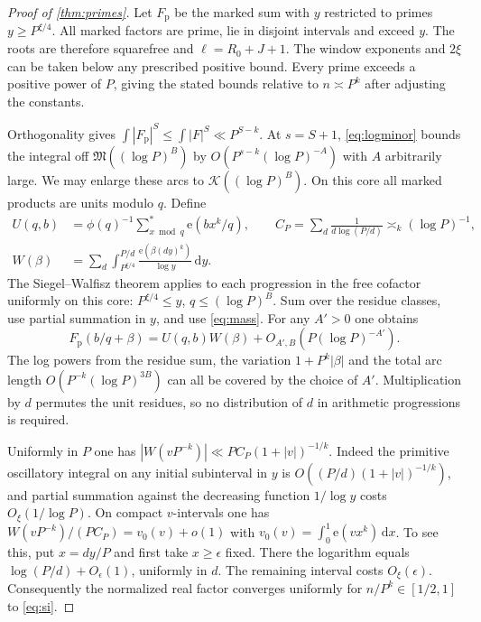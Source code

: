\documentclass[11pt,letterpaper]{article}
\theoremstyle{definition}
\newcommand{\M}{\mathfrak M}
\newcommand{\e}{\mathrm e}
\newcommand{\dd}{\,\mathrm d}
\begin{document}
\begin{proof}[Proof of \cref{thm:primes}]
Let $F_{\mathrm p}$ be the marked sum with $y$ restricted to primes
$y\ge P^{\xi/4}$. All marked factors are prime, lie in disjoint
intervals and exceed $y$. The roots are therefore squarefree and
$\ell=R_0+J+1$. The window exponents and $2\xi$ can be taken below
any prescribed positive bound. Every prime exceeds a positive power
of $P$, giving the stated bounds relative to $n\asymp P^k$ after
adjusting the constants.

Orthogonality gives $\int|F_{\mathrm p}|^S\le\int|F|^S
\ll P^{S-k}$. At $s=S+1$, \eqref{eq:logminor} bounds the integral
off $\M((\log P)^B)$ by $O(P^{s-k}(\log P)^{-A})$ with $A$ arbitrarily
large. We may enlarge these arcs to $\mathcal K((\log P)^B)$.
On this core all marked products are units modulo $q$. Define
\begin{align*}
 U(q,b)&=\phi(q)^{-1}\!\!\sum_{x\bmod q}^{\!*}\e(bx^k/q), \qquad C_P=\sum_d\frac1{d\log(P/d)}\asymp_k(\log P)^{-1},\\
 W(\beta)&=\sum_d\int_{P^{\xi/4}}^{P/d}
       \frac{\e(\beta(dy)^k)}{\log y}\dd y.
\end{align*}
The Siegel--Walfisz theorem \cite[Corollary 11.19]{MV} applies to
each progression in the free cofactor uniformly on this core:
$P^{\xi/4}\le y$, $q\le(\log P)^B$. Sum over the residue classes,
use partial summation in $y$, and use \eqref{eq:mass}. For any
$A'>0$ one obtains
\[
 F_{\mathrm p}(b/q+\beta)=U(q,b)W(\beta)
                 +O_{A',B}(P(\log P)^{-A'}).
\]
The log powers from the residue sum, the variation
$1+P^k|\beta|$ and the total arc length
$O(P^{-k}(\log P)^{3B})$ can all be covered by the choice of $A'$.
Multiplication by $d$ permutes the unit residues, so no distribution
of $d$ in arithmetic progressions is required.

Uniformly in $P$ one has
$|W(vP^{-k})|\ll P C_P(1+|v|)^{-1/k}$. Indeed the primitive
oscillatory integral on any initial subinterval in $y$ is
$O((P/d)(1+|v|)^{-1/k})$, and partial summation against the decreasing
function $1/\log y$ costs $O_\xi(1/\log P)$. On compact $v$-intervals
one has $W(vP^{-k})/(P C_P)=v_0(v)+o(1)$ with
$v_0(v)=\int_0^1\e(vx^k)\dd x$. To see this, put $x=dy/P$ and
first take $x\ge\epsilon$ fixed. There the logarithm equals
$\log(P/d)+O_\epsilon(1)$, uniformly in $d$. The remaining interval
costs $O_\xi(\epsilon)$. Consequently the normalized real factor
converges uniformly for $n/P^k\in[1/2,1]$ to \eqref{eq:si}.


\end{proof}
\end{document}
